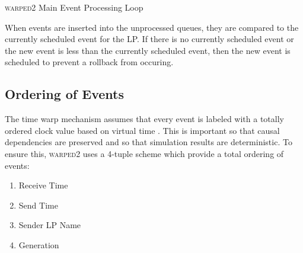 \documentclass[11pt]{book}
\begin{document}
\begin{algorithm}
\DontPrintSemicolon
{}


\caption{\textsc{warped2} Main Event Processing Loop}\label{warped2_processing}
\end{algorithm}

When events are inserted into the unprocessed queues, they are compared to the currently
scheduled event for the LP. If there is no currently scheduled event or the new event is less
than the currently scheduled event, then the new event is scheduled to prevent a rollback from
occuring.

\subsection{Ordering of Events}

The time warp mechanism assumes that every event is labeled with a totally ordered clock value
based on virtual time \cite{jefferson-85}. This is important so that causal dependencies
are preserved and so that simulation results are deterministic\cite{ronngren-99}. To ensure
this, \textsc{warped2} uses a 4-tuple scheme which provide a total ordering of events:

\begin{enumerate}
    \item Receive Time
    \item Send Time
    \item Sender LP Name
    \item Generation
\end{enumerate}
\end{document}
